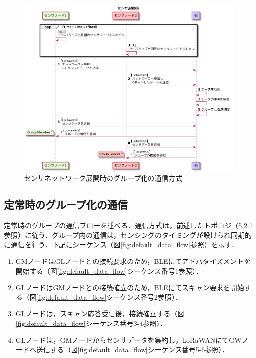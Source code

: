 \begin{figure}[]
    \begin{center}
    \includegraphics[width=15cm]{figures/v2.0/センサ起動時.png}
    \caption{センサネットワーク展開時のグループ化の通信方式}
    \label{fig:group_on_activation}
    \end{center}
\end{figure}

\subsection{定常時のグループ化の通信}
定常時のグループの通信フローを述べる．通信方式は，前述したトポロジ（5.2.1参照）に従う．グループ内の通信は，センシングのタイミングが設けられ同期的に通信を行う．下記にシーケンス（図\ref{fig:default_data_flow}参照）を示す．

\begin{enumerate}
    \item GMノードはGLノードとの接続要求のため，BLEにてアドバタイズメントを開始する（図\ref{fig:default_data_flow}シーケンス番号1参照）．
    \item GLノードはGMノードとの接続確立のため，BLEにてスキャン要求を開始する（図\ref{fig:default_data_flow}シーケンス番号2参照）．
    \item GLノードは，スキャン応答受信後，接続確立する（図\ref{fig:default_data_flow}シーケンス番号3-4参照）．
    \item GLノードは，GMノードからセンサデータを集約し，LoRaWANにてGWノードへ送信する（図\ref{fig:default_data_flow}シーケンス番号5-6参照）．
\end{enumerate}

